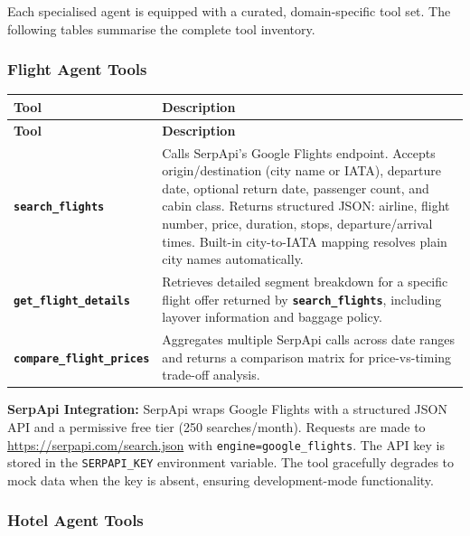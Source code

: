 \documentclass[12pt, a4paper]{article}
\newcommand{\tool}[1]{\texttt{\textbf{#1}}}
\begin{document}
Each specialised agent is equipped with a curated, domain-specific tool set. The following tables summarise the complete tool inventory.

\subsubsection{Flight Agent Tools}

\begin{longtable}{|p{4.2cm}|p{9.5cm}|}
  \hline
  \textbf{Tool} & \textbf{Description} \\
  \hline
  \endfirsthead
  \hline
  \textbf{Tool} & \textbf{Description} \\
  \hline
  \endhead
  \tool{search\_flights} & Calls SerpApi's Google Flights endpoint. Accepts origin/destination (city name or IATA), departure date, optional return date, passenger count, and cabin class. Returns structured JSON: airline, flight number, price, duration, stops, departure/arrival times. Built-in city-to-IATA mapping resolves plain city names automatically. \\
  \hline
  \tool{get\_flight\_details} & Retrieves detailed segment breakdown for a specific flight offer returned by \tool{search\_flights}, including layover information and baggage policy. \\
  \hline
  \tool{compare\_flight\_prices} & Aggregates multiple SerpApi calls across date ranges and returns a comparison matrix for price-vs-timing trade-off analysis. \\
  \hline
\end{longtable}

\textbf{SerpApi Integration:} SerpApi wraps Google Flights with a structured JSON API and a permissive free tier (250 searches/month). Requests are made to \url{https://serpapi.com/search.json} with \texttt{engine=google\_flights}. The API key is stored in the \texttt{SERPAPI\_KEY} environment variable. The tool gracefully degrades to mock data when the key is absent, ensuring development-mode functionality.

\subsubsection{Hotel Agent Tools}
\end{document}
